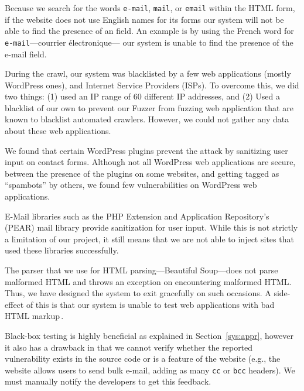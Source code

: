         Because we search for the words \texttt{e-mail}, \texttt{mail}, or \texttt{email} within the HTML form, if the website does not use English names for its forms our system will not be able to find the presence of an \email field. An example is by using the French word for \texttt{e-mail}---courrier {{\'e}}lectronique--- our system is unable to find the presence of the e-mail field. 
        
		During the crawl, our system was blacklisted by a few web
        applications (mostly WordPress ones), and Internet Service
        Providers (ISPs). To overcome this, we did two things: (1)
        used an IP range of 60 different IP addresses, and (2) Used a
        blacklist of our own to prevent our Fuzzer from fuzzing web
        application that are known to blacklist automated crawlers.
        However, we could not gather any data about these web
        applications.


		We found that certain WordPress plugins prevent the \ehi attack by sanitizing user input on contact forms. Although not all  WordPress web applications are secure, between the presence of the plugins on some websites, and getting tagged as ``spambots'' by others, we found few vulnerabilities on WordPress web applications.

        E-Mail libraries such as the PHP Extension and Application Repository's (PEAR) mail library provide sanitization for user input. While this is not strictly a limitation of our project, it still means that we are not able to inject sites that used these libraries successfully.

        The parser that we use for HTML parsing---Beautiful Soup---does not parse malformed HTML and throws an exception on encountering malformed HTML. Thus, we have designed the system to exit gracefully on such occasions. A side-effect of this is that our system is unable to test web applications with bad HTML markup\,\footnotemark.


        Black-box testing is highly beneficial as explained in Section~\ref{sys:appr}, however it also has a drawback in that we cannot verify whether the reported vulnerability exists in the source code or is a feature of the website (e.g., the website allows users to send bulk e-mail, adding as many \texttt{cc} or \texttt{bcc} headers). We must manually notify the developers to get this feedback.

